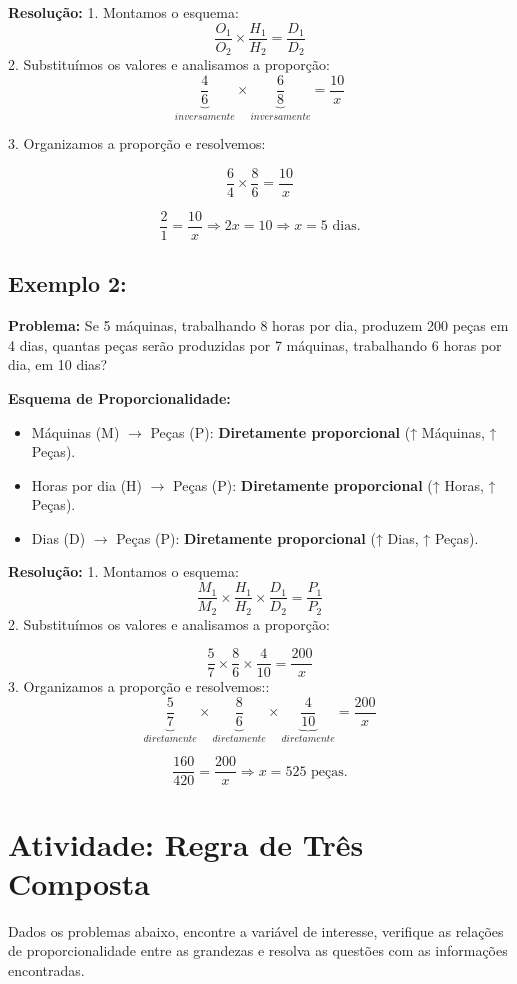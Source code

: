 \documentclass[12pt]{article}
\begin{document}
\begin{multicols}{2}
\textbf{Resolução:}
1. Montamos o esquema:
\[
\frac{O_1}{O_2} \times \frac{H_1}{H_2} = \frac{D_1}{D_2}
\]
2. Substituímos os valores e analisamos a proporção:
\[
    \underbrace{\frac{4}{6}}_{inversamente} \times \underbrace{\frac{6}{8}}_{inversamente} = \frac{10}{x}
\]

3. Organizamos a proporção e resolvemos:

\[
    \frac{6}{4} \times \frac{8}{6} = \frac{10}{x}
\]

\[
\frac{2}{1} = \frac{10}{x} \Rightarrow 2x = 10  \Rightarrow x = 5 \text{ dias.}
\]

\subsection*{Exemplo 2:}
\textbf{Problema:} Se 5 máquinas, trabalhando 8 horas por dia, produzem 200 peças em 4 dias, quantas peças serão produzidas por 7 máquinas, trabalhando 6 horas por dia, em 10 dias?

\textbf{Esquema de Proporcionalidade:}
\begin{itemize}
    \item Máquinas (M) $\rightarrow$ Peças (P): \textbf{Diretamente proporcional} (↑ Máquinas, ↑ Peças).
    \item Horas por dia (H) $\rightarrow$ Peças (P): \textbf{Diretamente proporcional} (↑ Horas, ↑ Peças).
    \item Dias (D) $\rightarrow$ Peças (P): \textbf{Diretamente proporcional} (↑ Dias, ↑ Peças).
\end{itemize}

\textbf{Resolução:}
1. Montamos o esquema:
\[
\frac{M_1}{M_2} \times \frac{H_1}{H_2} \times \frac{D_1}{D_2} = \frac{P_1}{P_2}
\]
2. Substituímos os valores e analisamos a proporção:

\[
\frac{5}{7} \times \frac{8}{6} \times \frac{4}{10} = \frac{200}{x}
\]
3. Organizamos a proporção e resolvemos::
\[
    \underbrace{\frac{5}{7}}_{diretamente} \times \underbrace{\frac{8}{6}}_{diretamente}
    \times\underbrace{\frac{4}{10}}_{diretamente} = \frac{200}{x}
\]

\[
\frac{160}{420} = \frac{200}{x} \Rightarrow x = 525 \text{ peças.}
\]

\section*{Atividade: Regra de Três Composta}

Dados os problemas abaixo, encontre a variável de interesse, verifique as relações de proporcionalidade entre as
grandezas e resolva as questões com as informações encontradas.


\end{multicols}
\end{document}
